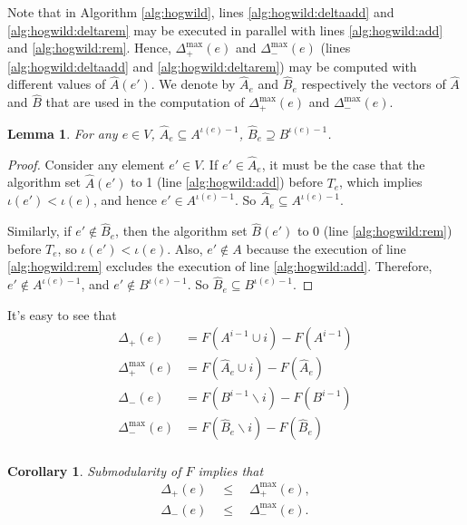 \documentclass{article} %
\newtheorem{cor}[thm]{Corollary}
\newtheorem{lem}[thm]{Lemma}
\begin{document}
Note that in Algorithm \ref{alg:hogwild}, lines \ref{alg:hogwild:deltaadd} and \ref{alg:hogwild:deltarem} may be executed in parallel with lines \ref{alg:hogwild:add} and \ref{alg:hogwild:rem}.
Hence, $\Delta_+^{\max}(e)$ and $\Delta_-^{\max}(e)$ (lines \ref{alg:hogwild:deltaadd} and \ref{alg:hogwild:deltarem}) may be computed with different values of $\hat{A}(e')$.
We denote by $\hat{A}_e$ and $\hat{B}_e$ respectively the vectors of $\hat{A}$ and $\hat{B}$ that are used in the computation of $\Delta_+^{\max}(e)$ and $\Delta_-^{\max}(e)$.

\begin{lem}\label{lem:set_bound} For any $e\in V$, $\hat{A}_e \subseteq A^{\iota(e)-1}$, $\hat{B}_e \supseteq B^{\iota(e)-1}$.
\end{lem}
\begin{proof}
Consider any element $e'\in V$.
If $e'\in \hat{A}_e$, it must be the case that the algorithm set $\hat{A}(e')$ to 1 (line \ref{alg:hogwild:add}) before $T_e$, which implies $\iota(e') < \iota(e)$, and hence $e' \in A^{\iota(e)-1}$.
So $\hat{A}_e \subseteq A^{\iota(e)-1}$.

Similarly, if $e'\not\in \hat{B}_e$, then the algorithm set $\hat{B}(e')$ to 0 (line \ref{alg:hogwild:rem}) before $T_e$, so $\iota(e') < \iota(e)$.
Also, $e'\not\in A$ because the execution of line \ref{alg:hogwild:rem} excludes the execution of line \ref{alg:hogwild:add}.
Therefore, $e'\not\in A^{\iota(e)-1}$, and $e'\not\in B^{\iota(e)-1}$.
So $\hat{B}_e \subseteq B^{\iota(e)-1}$.
\end{proof}

It's easy to see that
\begin{align*}
\Delta_{+}       (e) &= F(A^{i-1}\cup i) - F(A^{i-1})\\
\Delta_{+}^{\max}(e) &= F(\hat{A}_e\cup i) - F(\hat{A}_e)\\
\Delta_{-}       (e) &= F(B^{i-1}\backslash i) - F(B^{i-1})\\
\Delta_{-}^{\max}(e) &= F(\hat{B}_e\backslash i) - F(\hat{B}_e)\\
\end{align*}

\begin{cor}\label{cor:delta_bound}
Submodularity of $F$ implies that
\begin{align*}
\Delta_{+}(e) \quad\leq\quad \Delta_{+}^{\max}(e),\\
\Delta_{-}(e) \quad\leq\quad \Delta_{-}^{\max}(e).
\end{align*}
\end{cor}
\end{document}
